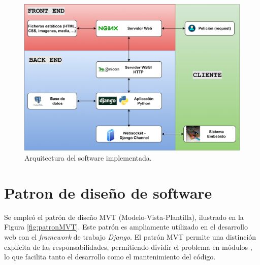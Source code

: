 \begin{figure}[H]
    \centering
    \includegraphics[width=1\linewidth]{Figuras/AplicacionWeb/arquitecturaSoft.png}
    \caption{Arquitectura del software implementada.}
    \label{fig:arquitecturaSoft}
\end{figure}

\section{Patron de diseño de software}
Se empleó el patrón de diseño MVT (Modelo-Vista-Plantilla), ilustrado en la Figura \ref{fig:patronMVT}. Este patrón es ampliamente utilizado en el desarrollo web con el \textit{framework} de trabajo \textit{Django}. El patrón MVT permite una distinción explícita de las responsabilidades, permitiendo dividir el problema en módulos , lo que facilita tanto el desarrollo como el mantenimiento del código. 

